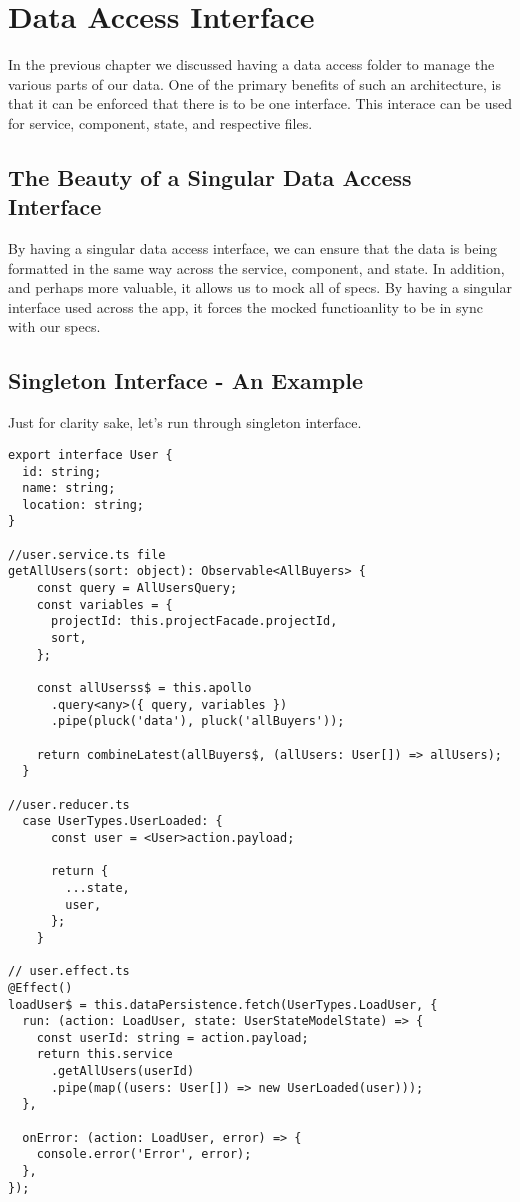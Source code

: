 \maketitle{}
\section{ Data Access Interface }
In the previous chapter we discussed having a data access folder to manage
the various parts of our data. One of the primary benefits of such an
architecture, is that it can be enforced that there is to be one interface. This
interace can be used for service, component, state, and respective files.

\subsection{ The Beauty of a Singular Data Access Interface }
By having a singular data access interface, we can ensure that the data is
being formatted in the same way across the service, component, and state. In
addition, and perhaps more valuable, it allows us to mock all of specs. By
having a singular interface used across the app, it forces the mocked
functioanlity to be in sync with our specs.

\subsection{ Singleton Interface - An Example }
Just for clarity sake, let's run through singleton interface.
\begin{lstlisting}
export interface User {
  id: string;
  name: string;
  location: string;
}

//user.service.ts file
getAllUsers(sort: object): Observable<AllBuyers> {
    const query = AllUsersQuery;
    const variables = {
      projectId: this.projectFacade.projectId,
      sort,
    };

    const allUserss$ = this.apollo
      .query<any>({ query, variables })
      .pipe(pluck('data'), pluck('allBuyers'));

    return combineLatest(allBuyers$, (allUsers: User[]) => allUsers);
  }

//user.reducer.ts
  case UserTypes.UserLoaded: {
      const user = <User>action.payload;

      return {
        ...state,
        user,
      };
    }

// user.effect.ts
@Effect()
loadUser$ = this.dataPersistence.fetch(UserTypes.LoadUser, {
  run: (action: LoadUser, state: UserStateModelState) => {
    const userId: string = action.payload;
    return this.service
      .getAllUsers(userId)
      .pipe(map((users: User[]) => new UserLoaded(user)));
  },

  onError: (action: LoadUser, error) => {
    console.error('Error', error);
  },
});
\end{lstlisting}
